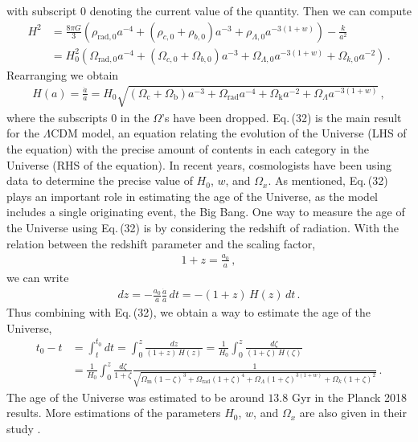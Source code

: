 \documentclass[11pt]{article}
\theoremstyle{break}
\theoremstyle{break}
\begin{document}
with subscript $0$ denoting the current value of the quantity. Then we can compute
\begin{align*}
H^2 &= 
\frac{8\pi G}{3} \left(\rho_{\text{rad},0}a^{-4} + (\rho_{c,0}+\rho_{b,0}) a^{-3}+
\rho_{\Lambda,0}a^{-3(1+w)}\right) - \frac{k}{a^2}\\
&= H_0^2 
\left(\Omega_{\text{rad},0} a^{-4} +(\Omega_{c,0} +\Omega_{b,0}) a^{-3}  +
\Omega_{\Lambda,0}a^{-3(1+w)} + 
\Omega_{k,0}a^{-2}\right)\,.
\tag{31}
\end{align*}
\setcounter{equation}{31}
Rearranging we obtain
\begin{align}
H(a) = \frac{\dot{a}}{a} = H_0 \sqrt{(\Omega_\text{c} + \Omega_\text{b})a^{-3} + \Omega_{\text{rad}}a^{-4}+\Omega_{\text{k}}a^{-2} + \Omega_{\Lambda}a^{-3(1+w)} }\,,
\end{align}
where the subscripts $0$ in the $\Omega$'s have been dropped. Eq.\,(32) is the main result for the $\Lambda$CDM model, an equation relating the evolution of the Universe (LHS of the equation) with the precise amount of contents in each category in the Universe (RHS of the equation). In recent years, cosmologists have been using data to determine the precise value of $H_0$, $w$, and $\Omega_x$. As mentioned, Eq.\,(32) plays an important role in estimating the age of the Universe, as the model includes a single originating event, the Big Bang. One way to measure the age of the Universe using Eq.\,(32) is by considering the redshift of radiation. With the relation between the redshift parameter and the scaling factor,
\begin{align}
1+z = \frac{a_0}{a}\,,
\end{align}
we can write
\begin{align}
dz = -\frac{a_0}{a}\frac{\dot{a}}{a}\, dt = -(1+z) \, H(z) \, dt\,.
\end{align}
Thus combining with Eq.\,(32), we obtain a way to estimate the age of the Universe,
\begin{align*}
t_0-t
&= \int_{t}^{t_0}dt = \int_0^z \frac{dz}{(1+z) \, H(z)} = \frac{1}{H_0}\int_0^z \frac{d\zeta}{(1+\zeta) \, H(\zeta)}\\
&= \frac{1}{H_0}\int_0^z \frac{d\zeta}{1+\zeta} \frac{1}{\sqrt{\Omega_{\text{m}}(1-\zeta)^3 + \Omega_{\text{rad}}(1+\zeta)^4 + \Omega_{\Lambda}(1+\zeta)^{3(1+w)} + \Omega_{k}(1+\zeta)^2}}\,. \tag{35}
\end{align*}
The age of the Universe was estimated to be around $13.8$ Gyr in the Planck 2018 results. More estimations of the parameters $H_0$, $w$, and $\Omega_x$ are also given in their study \cite{Planck}. 
\end{document}
